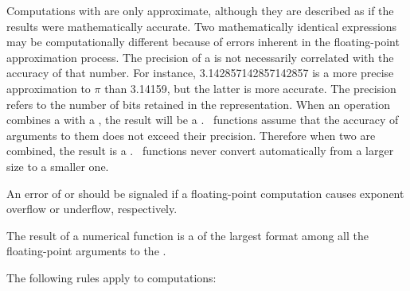 Computations with  are only approximate,
although they are described as if the results
were mathematically accurate. 
Two mathematically identical
expressions may be computationally different because of errors
inherent in the floating-point approximation process.
The precision of a  is not necessarily
correlated with the accuracy of that number.
For instance, 3.142857142857142857 is a more precise approximation
to $\pi$ than 3.14159, but the latter is more accurate.
The precision refers to the number of bits retained in the representation.
When an operation combines a  with a 
,
the result will be a . 
\clisp\ functions assume that the accuracy of
arguments to them does not exceed their precision.  Therefore
when two  
are combined, the result is a . 
\clisp\ functions 
never convert automatically from a larger size to a smaller one.
\endsubsubsection%


An error of  
or  should be signaled if a 
floating-point computation causes exponent overflow or underflow, respectively.

\endsubsubsection%



The result of a numerical function is a  of the 
largest format among all the floating-point arguments to the . 

\endsubsubsection%

\endsubsection%

The following rules apply to  computations:

